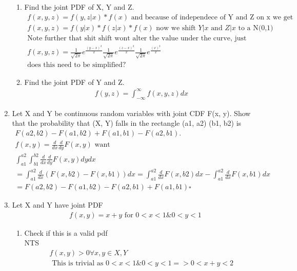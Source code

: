 \documentclass[11pt]{article}
\begin{document}
\begin{enumerate}
\begin{enumerate}
	\item Find the joint PDF of X, Y and Z.
	\begin{gather}
		f(x,y,z) = f(y,z|x)*f(x) \text{ and because of independece of Y and Z on x we get} \\
		f(x,y,z) = f(y|x)*f(z|x)*f(x) \text{ now we shift $Y|x$ and $Z|x$ to a N(0,1)}\\
		\text{Note further that shit shift wont alter the value under the curve, just where the density takes place}\\
			f(x,y,z) = \frac{1}{\sqrt{2\pi}} e ^ {\frac{(y-x)^2}{2}} \frac{1}{\sqrt{2\pi}} e ^ {\frac{(z-x)^2}{2}} \frac{1}{\sqrt{2\pi}} e ^ {\frac{(x)^2}{2}} \\
			\text{does this need to be simplified?}
	\end{gather}
	\item Find the joint PDF of Y and Z.
	\begin{gather}
		f(y,z) = \int_{-\infty}^{\infty} f(x,y,z) dx
	\end{gather}
\end{enumerate}
\item Let X and Y be continuous random variables with joint CDF F(x, y). Show that the probability that (X, Y) falls in the rectangle (a1, a2) (b1, b2) is
\begin{gather}
	F(a2, b2) - F(a1, b2) + F(a1, b1) - F(a2, b1).\\
	f(x,y) = \frac{d}{dx}\frac{d}{dy}F(x,y) \text{ want} \\
	\int_{a1}^{a2}\int_{b1}^{b2}\frac{d}{dx}\frac{d}{dy}F(x,y)dydx\\
	=\int_{a1}^{a2}\frac{d}{dx}(F(x,b2)-F(x,b1)) dx = \int_{a1}^{a2}\frac{d}{dx}F(x,b2) dx - \int_{a1}^{a2}\frac{d}{dx}F(x,b1) dx\\
	= F(a2,b2)-F(a1,b2)-F(a2,b1)+F(a1,b1) \square
\end{gather}
\item Let X and Y have joint PDF
\begin{gather}
	f(x,y) = x+y \text{ for } 0<x<1 \& 0<y<1
\end{gather}
\begin{enumerate}
	\item Check if this is a valid pdf\\
	NTS
	\begin{gather}
		f(x,y)>0 \forall x,y \in X,Y \\
		\text{ This is trivial as } 0<x<1 \& 0<y<1 =>  0<x+y<2 \\

\end{gather}
\end{enumerate}
\end{enumerate}
\end{document}
